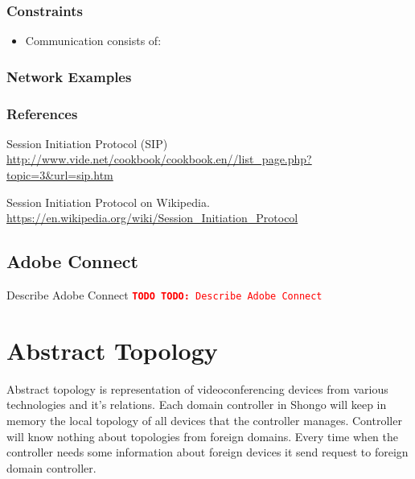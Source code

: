 \documentclass[a4paper]{report}
\newcommand{\TODO}[1]{%
\def\empty{}%
\def\prvniparametr{#1}%
\ifx\prvniparametr\empty%
\begingroup\tt\textcolor{red}{\noindent\textbf{TODO}}\endgroup
\else%
\begingroup\tt\textcolor{red}{\noindent\textbf{TODO:}\ #1}\endgroup
\fi%
}
\begin{document}
\subsection{Constraints}

\begin{itemize}

\item Communication consists of:

\end{itemize}

\subsection{Network Examples}

\subsection{References}

\renewcommand{\bibsection}{}
\begin{thebibliography}{1}

Session Initiation Protocol (SIP)
\\ \url{http://www.vide.net/cookbook/cookbook.en//list_page.php?topic=3&url=sip.htm}

Session Initiation Protocol on Wikipedia.
\\ \url{https://en.wikipedia.org/wiki/Session_Initiation_Protocol}

\end{thebibliography}


\section{Adobe Connect}

\TODO{Describe Adobe Connect}


\chapter{Abstract Topology}

Abstract topology is representation of videoconferencing devices from various technologies and it's relations. Each domain controller in Shongo will keep in memory the local topology of all devices that the controller manages.
Controller will know nothing about topologies from foreign domains. Every time when the controller needs some information about foreign devices it send request to foreign domain controller.
\end{document}
